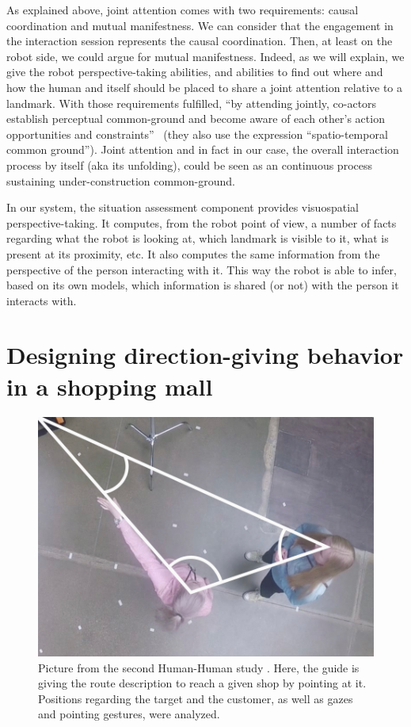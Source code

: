 \documentclass[a4paper,11pt,twoside]{StyleThese}
\begin{document}
As explained above, joint attention comes with two requirements: causal coordination and mutual manifestness. We can consider that the engagement in the interaction session represents the causal coordination. Then, at least on the robot side, we could argue for mutual manifestness. Indeed, as we will explain, we give the robot perspective-taking abilities, and abilities to find out where and how the human and itself should be placed to share a joint attention relative to a landmark. With those requirements fulfilled, ``by attending jointly, co-actors establish perceptual common-ground and become aware of each other's action opportunities and constraints''~\cite{curioni_2019_joint} (they also use the expression ``spatio-temporal common ground''). Joint attention and in fact in our case, the overall interaction process by itself (aka its unfolding), could be seen as an continuous process sustaining under-construction common-ground.

In our system, the situation assessment component provides visuospatial perspective-taking. It computes, from the robot point of view, a number of facts regarding what the robot is looking at, which landmark is visible to it, what is present at its proximity, etc. It also computes the same information from the perspective of the person interacting with it. This way the robot is able to infer, based on its own models, which information is shared (or not) with the person it interacts with.


\section{Designing direction-giving behavior in a shopping mall}
\label{sec:modeling}

\begin{figure}[!t]
	\centering
	\includegraphics[scale=0.7]{figures/chapter3/human_guide.png}
	\caption{\label{fig:chap3_human_guide} Picture from the second Human-Human study \cite{belhassein_2017_human}. Here, the guide is giving the route description to reach a given shop by pointing at it. Positions regarding the target and the customer, as well as gazes and pointing gestures, were analyzed.}
\end{figure}
\end{document}
